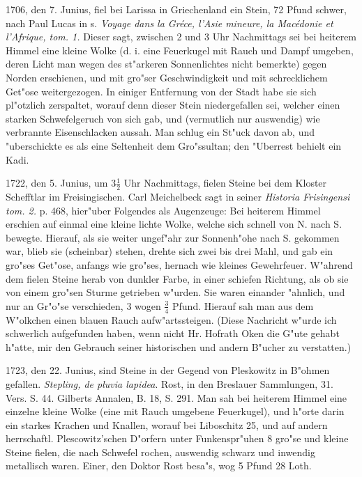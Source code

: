 \documentclass[a4paper, 11pt, oneside, polutonikogreek, german]{article}
\begin{document}
1706, den 7. Junius, fiel bei Larissa in Griechenland ein Stein, 72 Pfund schwer, nach Paul Lucas in s. \emph{Voyage dans la Gréce, l'Asie mineure, la Macédonie et l'Afrique, tom. 1.} Dieser sagt, zwischen 2 und 3 Uhr Nachmittags sei bei heiterem Himmel eine kleine Wolke (d. i. eine Feuerkugel mit Rauch und Dampf umgeben, deren Licht man wegen des st"arkeren Sonnenlichtes nicht bemerkte) gegen Norden erschienen, und mit gro"ser Geschwindigkeit und mit schrecklichem Get"ose weitergezogen. In einiger Entfernung von der Stadt habe sie sich pl"otzlich zerspaltet, worauf denn dieser Stein niedergefallen sei, welcher einen starken Schwefelgeruch von sich gab, und (vermutlich nur auswendig) wie verbrannte Eisenschlacken aussah. Man schlug ein St"uck davon ab, und "uberschickte es als eine Seltenheit dem Gro"ssultan; den "Uberrest behielt ein Kadi.

1722, den 5. Junius, um $\mathfrak{3\frac{1}{2}}$ Uhr Nachmittags, fielen Steine bei dem Kloster Schefftlar im Freisingischen. Carl Meichelbeck sagt in seiner \emph{Historia Frisingensi tom. 2.} p. 468, hier"uber Folgendes als Augenzeuge: Bei heiterem Himmel erschien auf einmal eine kleine lichte Wolke, welche sich schnell von N. nach S. bewegte. Hierauf, als sie weiter ungef"ahr zur Sonnenh"ohe nach S. gekommen war, blieb sie (scheinbar) stehen, drehte sich zwei bis drei Mahl, und gab ein gro"ses Get"ose, anfangs wie gro"ses, hernach wie kleines Gewehrfeuer. W"ahrend dem fielen Steine herab von dunkler Farbe, in einer schiefen Richtung, als ob sie von einem gro"sen Sturme getrieben w"urden. Sie waren einander "ahnlich, und nur an Gr"o"se verschieden, 3 wogen $\mathfrak{\frac{3}{4}}$ Pfund. Hierauf sah man aus dem W"olkchen einen blauen Rauch aufw"artssteigen. (Diese Nachricht w"urde ich schwerlich aufgefunden haben, wenn nicht Hr. Hofrath Oken die G"ute gehabt h"atte, mir den Gebrauch seiner historischen und andern B"ucher zu verstatten.)

1723, den 22. Junius, sind Steine in der Gegend von Pleskowitz in B"ohmen gefallen. \emph{Stepling, de pluvia lapidea}. Rost, in den Breslauer Sammlungen, 31. Vers. S. 44. Gilberts Annalen, B. 18, S. 291. Man sah bei heiterem Himmel eine einzelne kleine Wolke (eine mit Rauch umgebene Feuerkugel), und h"orte darin ein starkes Krachen und Knallen, worauf bei Liboschitz 25, und auf andern herrschaftl. Plescowitz'schen D"orfern unter Funkenspr"uhen 8 gro"se und kleine Steine fielen, die nach Schwefel rochen, auswendig schwarz und inwendig metallisch waren. Einer, den Doktor Rost besa"s, wog 5 Pfund 28 Loth.
\end{document}
